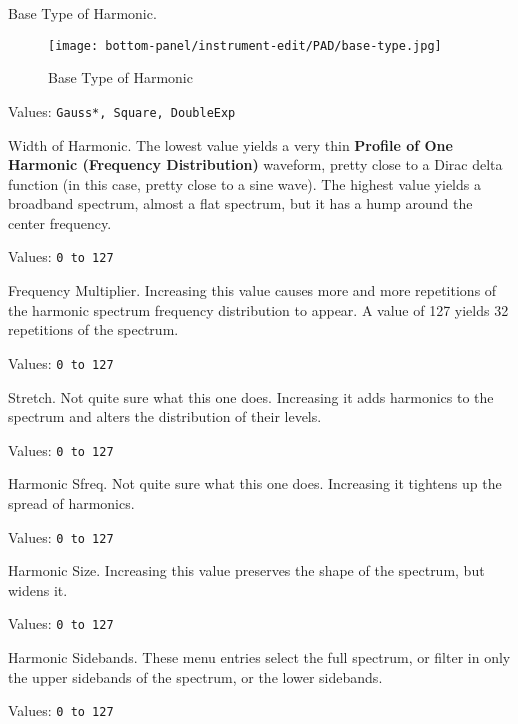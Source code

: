    \setcounter{ItemCounter}{0}      %

   Base Type of Harmonic.

\begin{figure}[H]
   \centering
   \texttt{[image: bottom-panel/instrument-edit/PAD/base-type.jpg]}
   \caption{Base Type of Harmonic}
   \label{fig:padsynth_base_type_of_harmonic}
\end{figure}

   Values: \texttt{Gauss*, Square, DoubleExp}

   Width of Harmonic.
   The lowest value yields a very thin
   \textbf{Profile of One Harmonic (Frequency Distribution)}
   waveform, pretty close to a Dirac delta function (in this case, pretty close
   to a sine wave).
   The highest value yields a broadband spectrum, almost a flat spectrum, but
   it has a hump around the center frequency.

   Values: \texttt{0 to 127}

   Frequency Multiplier.
   Increasing this value causes more and more repetitions of the harmonic
   spectrum frequency distribution to appear.  A value of 127 yields 32
   repetitions of the spectrum.

   Values: \texttt{0 to 127}

   Stretch.
   Not quite sure what this one does.  Increasing it adds harmonics to the
   spectrum and alters the distribution of their levels.

   Values: \texttt{0 to 127}

   Harmonic Sfreq.
   Not quite sure what this one does.  Increasing it tightens up the spread of
   harmonics.

   Values: \texttt{0 to 127}

   Harmonic Size.
   Increasing this value preserves the shape of the spectrum, but widens it.

   Values: \texttt{0 to 127}

   Harmonic Sidebands.
   These menu entries select the full spectrum, or filter in only
   the upper sidebands of the spectrum, or the lower sidebands.

   Values: \texttt{0 to 127}

